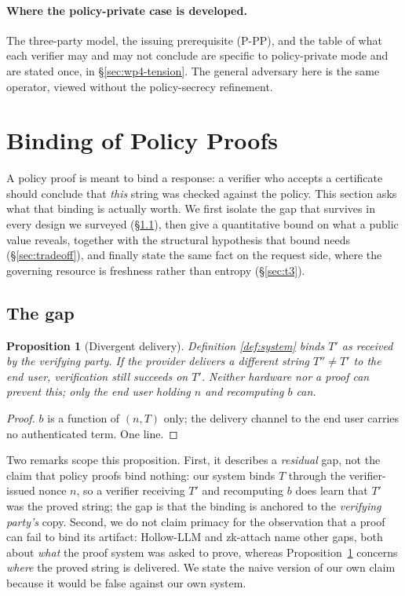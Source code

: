\documentclass[10pt,journal,compsoc]{IEEEtran}
\newtheorem{proposition}[theorem]{Proposition}
\begin{document}
\paragraph{Where the policy-private case is developed.} The three-party model,
the issuing prerequisite (P-PP), and the table of what each verifier may and may
not conclude are specific to policy-private mode and are stated once, in
\S\ref{sec:wp4-tension}. The general adversary here is the same operator, viewed
without the policy-secrecy refinement.

\section{Binding of Policy Proofs}
\label{sec:binding}

A policy proof is meant to bind a response: a verifier who accepts a
certificate should conclude that \emph{this} string was checked against the
policy. This section asks what that binding is actually worth. We first isolate
the gap that survives in every design we surveyed (\S\ref{sec:gap}), then give
a quantitative bound on what a public value reveals, together with the
structural hypothesis that bound needs (\S\ref{sec:tradeoff}), and finally
state the same fact on the request side, where the governing resource is
freshness rather than entropy (\S\ref{sec:t3}).

\subsection{The gap}
\label{sec:gap}

\begin{proposition}[Divergent delivery]
\label{thm:gap}
Definition \ref{def:system} binds $T'$ \emph{as received by the verifying party}. If the
provider delivers a different string $T'' \ne T'$ to the end user, verification
still succeeds on $T'$. Neither hardware nor a proof can prevent this; only the
end user holding $n$ and recomputing $b$ can.
\end{proposition}
\begin{proof}
$b$ is a function of $(n,T)$ only; the delivery channel to the end user carries
no authenticated term. One line.
\end{proof}

Two remarks scope this proposition. First, it describes a \emph{residual} gap,
not the claim that policy proofs bind nothing: our system binds $T$ through the
verifier-issued nonce $n$, so a verifier receiving $T'$ and recomputing $b$ does
learn that $T'$ was the proved string; the gap is that the binding is anchored
to the \emph{verifying party's} copy. Second, we do not claim primacy for the
observation that a proof can fail to bind its artifact: Hollow-LLM
\cite{hollowllm} and zk-attach \cite{zkattach} name other gaps, both about
\emph{what} the proof system was asked to prove, whereas
Proposition~\ref{thm:gap} concerns \emph{where} the proved string is delivered.
We state the naive version of our own claim because it would be false against
our own system.
\end{document}
